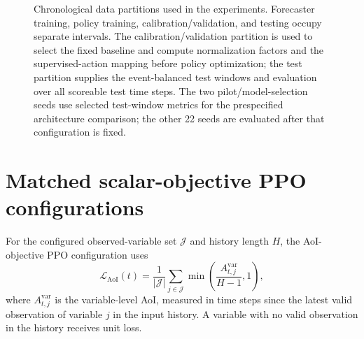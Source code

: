 \documentclass[preprint,12pt]{elsarticle}
\begin{document}
\begin{figure}[htbp]
  \centering
  \resizebox{\linewidth}{!}{}
  \caption{Chronological data partitions used in the experiments. Forecaster training,
  policy training, calibration/validation, and testing occupy separate intervals.
  The calibration/validation partition is used to select the fixed baseline and
  compute normalization factors and the supervised-action mapping before policy optimization;
  the test partition supplies the event-balanced test windows and evaluation over all
  scoreable test time steps. The two pilot/model-selection seeds use selected
  test-window metrics for the prespecified architecture comparison; the other 22
  seeds are evaluated after that configuration is fixed.}
\end{figure}

\FloatBarrier
\section{Matched scalar-objective PPO configurations}

For the configured observed-variable set $\mathcal{J}$ and history length $H$,
the AoI-objective PPO configuration
uses
\begin{equation}
  \mathcal{L}_{\mathrm{AoI}}(t)
  =\frac{1}{|\mathcal{J}|}\sum_{j\in\mathcal{J}}
  \min\left(\frac{A^{\mathrm{var}}_{t,j}}{H-1},1\right),
\end{equation}
where $A^{\mathrm{var}}_{t,j}$ is the variable-level AoI, measured in time steps
since the latest valid observation of
variable $j$ in the input history. A variable with no valid observation in the
history receives unit loss.
\end{document}
